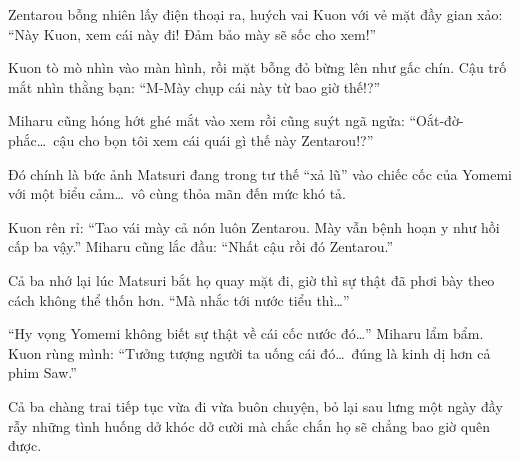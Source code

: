 \documentclass[../main.tex]{subfiles}
\begin{document}
Zentarou bỗng nhiên lấy điện thoại ra, huých vai Kuon với vẻ mặt đầy gian xảo: ``Này Kuon, xem cái này đi! Đảm bảo mày sẽ sốc cho xem!''

Kuon tò mò nhìn vào màn hình, rồi mặt bỗng đỏ bừng lên như gấc chín. Cậu trố mắt nhìn thằng bạn: ``M-Mày chụp cái này từ bao giờ thế!?''

Miharu cũng hóng hớt ghé mắt vào xem rồi cũng suýt ngã ngửa: ``Oắt-đờ-phắc\dots\ cậu cho bọn tôi xem cái quái gì thế này Zentarou!?''

Đó chính là bức ảnh Matsuri đang trong tư thế ``xả lũ'' vào chiếc cốc của Yomemi với một biểu cảm\dots\ vô cùng thỏa mãn đến mức khó tả.

Kuon rên rỉ: ``Tao vái mày cả nón luôn Zentarou. Mày vẫn bệnh hoạn y như hồi cấp ba vậy.'' Miharu cũng lắc đầu: ``Nhất cậu rồi đó Zentarou.''

Cả ba nhớ lại lúc Matsuri bắt họ quay mặt đi, giờ thì sự thật đã phơi bày theo cách không thể thốn hơn. ``Mà nhắc tới nước tiểu thì\dots''

``Hy vọng Yomemi không biết sự thật về cái cốc nước đó\dots'' Miharu lẩm bẩm.
Kuon rùng mình: ``Tưởng tượng người ta uống cái đó\dots\ đúng là kinh dị hơn cả phim Saw.''

Cả ba chàng trai tiếp tục vừa đi vừa buôn chuyện, bỏ lại sau lưng một ngày đầy rẫy những tình huống dở khóc dở cười mà chắc chắn họ sẽ chẳng bao giờ quên được.
\end{document}
